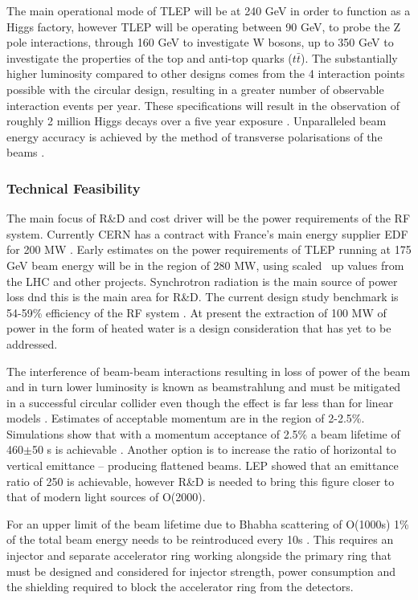The main operational mode of TLEP will be at 240 GeV in order to function as a Higgs factory, however TLEP will be operating between 90 GeV, to probe the Z pole interactions, through 160 GeV to investigate W bosons, up to 350 GeV to investigate the properties of the top and anti-top quarks ($t\bar{t}$). The substantially higher luminosity compared to other designs comes from the 4 interaction points possible with the circular design, resulting in a greater number of observable interaction events per year. These specifications will result in the observation of roughly 2 million Higgs decays over a five year exposure \cite{TLEP:CERNReport}. Unparalleled beam energy accuracy is achieved by the method of transverse polarisations of the beams \cite{TLEP:Review}.

\subsubsection{Technical Feasibility}

The main focus of R\&D and cost driver will be the power requirements of the RF system. Currently CERN has a contract with France's main energy supplier EDF for 200 MW \cite{TLEP:Luminosity}. Early estimates on the power requirements of TLEP running at 175 GeV beam energy will be in the region of 280 MW, using scaled \textemdash \, up values from the LHC and other projects. Synchrotron radiation is the main source of power loss dnd this is the main area for R\&D. The current design study benchmark is 54-59\% efficiency of the RF system \cite{TLEP:Review}. At present the extraction of 100 MW of power in the form of heated water is a design consideration that has yet to be addressed.

The interference of beam-beam interactions resulting in loss of power of the beam and in turn lower luminosity is known as beamstrahlung and must be mitigated in a successful circular collider even though the effect is far less than for linear models \cite{TLEP:Luminosity}. Estimates of acceptable momentum are in the region of 2-2.5\%. Simulations show that with a momentum acceptance of 2.5\% a beam lifetime of 460$\pm$50 s is achievable \cite{TLEP:EnergyRestriction}. Another option is to increase the ratio of horizontal to vertical emittance – producing flattened beams. LEP showed that an emittance ratio of 250 is achievable, however R\&D is needed to bring this figure closer to that of modern light sources of O(2000).

For an upper limit of the beam lifetime due to Bhabha scattering of O(1000s) 1\% of the total beam energy needs to be reintroduced every 10s \cite{TLEP:Janot} \cite{TLEP:CERNOverview}. This requires an injector and separate accelerator ring working alongside the primary ring that must be designed and considered for injector strength, power consumption and the shielding required to block the accelerator ring from the detectors. 

